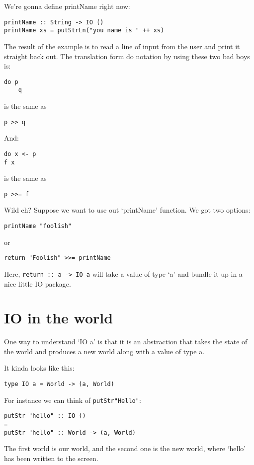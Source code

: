 \documentclass[11pt,a4paper,titlepage]{scrartcl}
\begin{document}
We're gonna define printName right now:
\begin{lstlisting}
printName :: String -> IO ()
printName xs = putStrLn("you name is " ++ xs)
\end{lstlisting}

The result of the example is to read a line of input from the user and
print it straight back out. The translation form do notation by using
these two bad boys is:
\begin{lstlisting}
do p
    q
\end{lstlisting}
is the same as
\begin{lstlisting}
p >> q
\end{lstlisting}

And:
\begin{lstlisting}
do x <- p
f x
\end{lstlisting}
is the same as

\begin{lstlisting}
p >>= f
\end{lstlisting}

Wild eh? Suppose we want to use out `printName' function. We got two
options:
\begin{lstlisting}
printName "foolish"
\end{lstlisting}

or
\begin{lstlisting}
return "Foolish" >>= printName
\end{lstlisting}

Here, \lstinline|return :: a -> IO a| will take a value of type `a' and
bundle it up in a nice little IO package.

\section{IO in the world}%
\label{sec:world}
One way to understand `IO a' is that it is an abstraction that takes the
state of the world and produces a new world along with a value of type a.

It kinda looks like this:
\begin{lstlisting}
type IO a = World -> (a, World)
\end{lstlisting}

For instance we can think of \lstinline|putStr"Hello"|:
\begin{lstlisting}
putStr "hello" :: IO ()
=
putStr "hello" :: World -> (a, World)
\end{lstlisting}

The first world is our world, and the second one is the new world, where
`hello' has been written to the screen.
\end{document}
